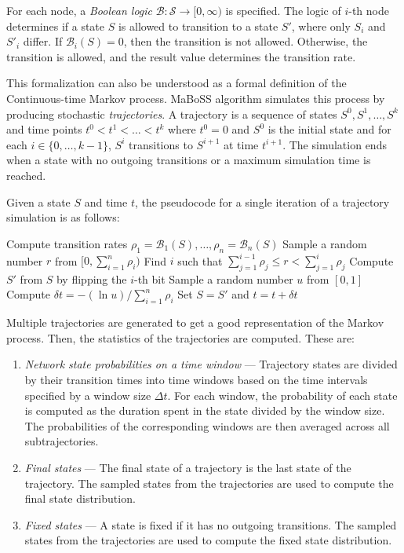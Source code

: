 \documentclass[times, twoside]{zHenriquesLab-StyleBioRxiv}
\begin{document}
For each node, a \emph{Boolean logic} $\mathcal{B}: \mathcal{S} \rightarrow [0, \infty)$ is specified. The logic of $i$-th node determines if a state $S$ is allowed to transition to a state $S'$, where only $S_i$ and $S'_i$ differ. If $\mathcal{B}_i(S) = 0$, then the transition is not allowed. Otherwise, the transition is allowed, and the result value determines the transition rate.

This formalization can also be understood as a formal definition of the Continuous-time Markov process. MaBoSS algorithm simulates this process by producing stochastic \emph{trajectories}. A trajectory is a sequence of states $S^0, S^1, \dots, S^k$ and time points $t^0 < t^1 < \dots < t^k$ where $t^0 = 0$ and $S^0$ is the initial state and for each $i \in \{0, \dots, k-1\}$, $S^i$ transitions to $S^{i+1}$ at time $t^{i+1}$. The simulation ends when a state with no outgoing transitions or a maximum simulation time is reached.

Given a state $S$ and time $t$, the pseudocode for a single iteration of a trajectory simulation is as follows:
\begin{algorithmic}[1]
\State Compute transition rates $\rho_1 = \mathcal{B}_1(S), \dots, \rho_n = \mathcal{B}_n(S)$
\State Sample a random number $r$ from $[0, \sum_{i=1}^n \rho_i)$
\State Find $i$ such that $\sum_{j=1}^{i-1} \rho_j \leq r < \sum_{j=1}^{i} \rho_j$
\State Compute $S'$ from $S$ by flipping the $i$-th bit
\State Sample a random number $u$ from $[0, 1]$
\State Compute $\delta t = -(\ln u) / \sum_{i=1}^n \rho_i$
\State Set $S = S'$ and $t = t + \delta t$
\end{algorithmic}

Multiple trajectories are generated to get a good representation of the Markov process. Then, the statistics of the trajectories are computed. These are:

\begin{enumerate}
    \item \emph{Network state probabilities on a time window} --- Trajectory states are divided by their transition times into time windows based on the time intervals specified by a window size $\Delta t$. For each window, the probability of each state is computed as the duration spent in the state divided by the window size. The probabilities of the corresponding windows are then averaged across all subtrajectories.
    \item \emph{Final states} --- The final state of a trajectory is the last state of the trajectory. The sampled states from the trajectories are used to compute the final state distribution.
    \item \emph{Fixed states} --- A state is fixed if it has no outgoing transitions. The sampled states from the trajectories are used to compute the fixed state distribution.
\end{enumerate}
\end{document}
